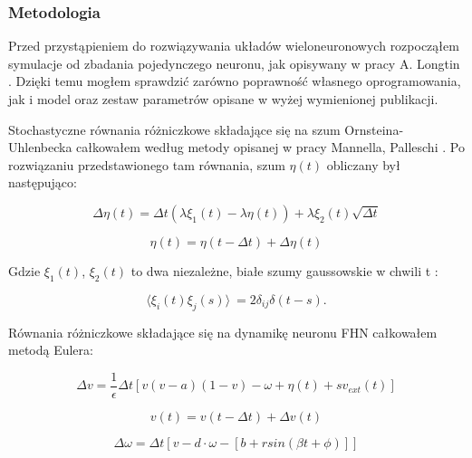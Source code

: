  \subsubsection{Metodologia}
  
  Przed przystąpieniem do rozwiązywania układów wieloneuronowych rozpocząłem symulacje od zbadania pojedynczego neuronu, jak opisywany w pracy A. Longtin \cite{longtin}. Dzięki temu mogłem sprawdzić zarówno poprawność własnego oprogramowania, jak i model oraz zestaw parametrów opisane w wyżej wymienionej publikacji.
  
  Stochastyczne równania różniczkowe składające się na szum Ornsteina-Uhlenbecka całkowałem według metody opisanej w pracy Mannella, Palleschi \cite{mannella}. Po rozwiązaniu przedstawionego tam równania, szum $\eta (t)$ obliczany był następująco:

  \begin{equation} \label{eq:deta:final}
    \Delta \eta(t) = \Delta t(\lambda \xi_1(t) - \lambda \eta(t)) + \lambda \xi_2(t) \sqrt{\Delta t}
  \end{equation}

  \begin{equation} \label{eq:eta:final}
    \eta(t) = \eta(t-\Delta t) + \Delta \eta(t)
  \end{equation}

  Gdzie $\xi_1(t)$, $\xi_2(t)$ to dwa niezależne, białe szumy gaussowskie w chwili t :

  \begin{equation} \label{eq:eta:gauss}
    \langle \xi_i(t) \xi_j(s) \rangle\ = 2 \delta_{ij} \delta (t-s) .
  \end{equation}

  Równania różniczkowe składające się na dynamikę neuronu FHN całkowałem metodą Eulera:

  \begin{equation} \label{eq:discrete1:deltav}
    \Delta v = \frac{1}{\epsilon} \Delta t [v(v-a)(1-v)- \omega  + \eta(t) + sv_{ext}(t)]
  \end{equation}

  \begin{equation} \label{eq:discrete1:v}
    v(t) = v(t-\Delta t) + \Delta v(t)
  \end{equation}

  \begin{equation} \label{eq:discrete1:deltaw}
    \Delta \omega = \Delta t [v - d \cdot \omega - [b + r sin(\beta t + \phi)]]
  \end{equation}

